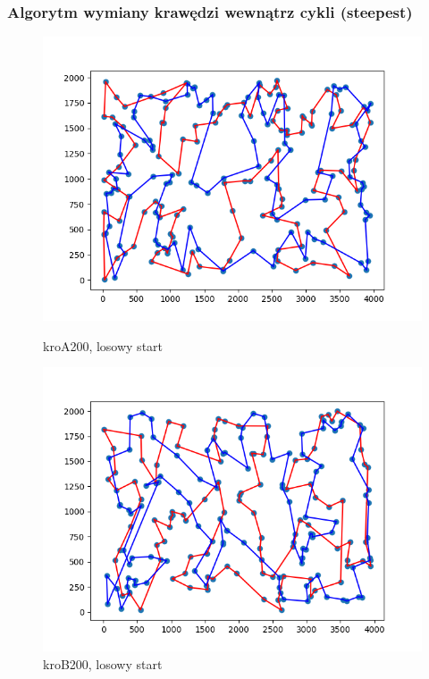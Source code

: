 \documentclass[11pt]{article}
\begin{document}
\subsubsection{Algorytm wymiany krawędzi wewnątrz cykli (steepest)}
\begin{figure}[H]
    \centering
    \begin{minipage}[t]{0.45\textwidth}
        \centering
        \includegraphics[width=\linewidth]{best_paths/kroA200/traverse_steepest/randomstart.png}
        \caption{kroA200, losowy start}
    \end{minipage}
    \hfill
    \begin{minipage}[t]{0.45\textwidth}
        \centering
        \includegraphics[width=\linewidth]{best_paths/kroB200/traverse_steepest/randomstart.png}
        \caption{kroB200, losowy start}
    \end{minipage}


\end{figure}
\end{document}
